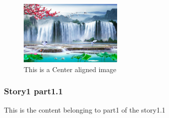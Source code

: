 \documentclass{article}
\begin{document}
\begin{figure}[h]
	\centering
	\includegraphics[width=5cm]{image1.jpg}
	\caption{This is a Center aligned image}
\end{figure}



\subsubsection*{Story1 part1.1}
This is the content belonging to part1 of the story1.1
\end{document}
